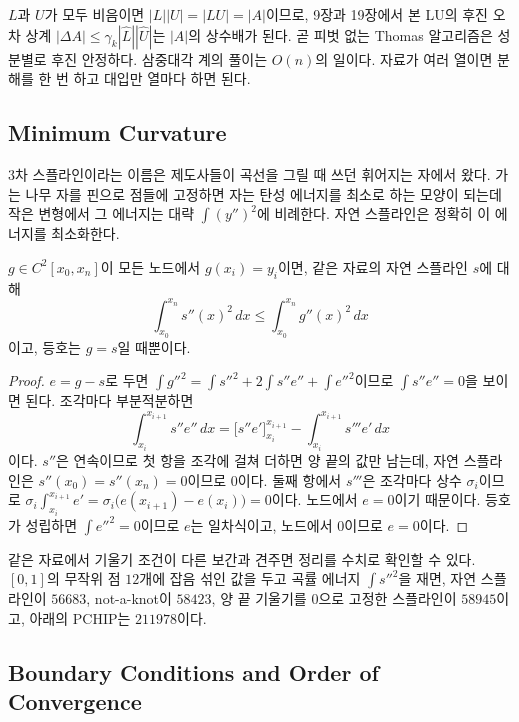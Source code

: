 $L$과 $U$가 모두 비음이면 $|L||U|=|LU|=|A|$이므로, 9장과 19장에서 본 LU의 후진 오차 상계 $|\Delta A|\le\gamma_k|\hat L||\hat U|$는 $|A|$의 상수배가 된다. 곧 피벗 없는 Thomas 알고리즘은 성분별로 후진 안정하다. 삼중대각 계의 풀이는 $O(n)$의 일이다. 자료가 여러 열이면 분해를 한 번 하고 대입만 열마다 하면 된다.

\subsection{Minimum Curvature}

3차 스플라인이라는 이름은 제도사들이 곡선을 그릴 때 쓰던 휘어지는 자에서 왔다. 가는 나무 자를 핀으로 점들에 고정하면 자는 탄성 에너지를 최소로 하는 모양이 되는데 작은 변형에서 그 에너지는 대략 $\int(y'')^2$에 비례한다. 자연 스플라인은 정확히 이 에너지를 최소화한다\cite{holladay1957}.

\begin{theorem}[Holladay]
\label{thm:holladay}
$g\in C^2[x_0,x_n]$이 모든 노드에서 $g(x_i)=y_i$이면, 같은 자료의 자연 스플라인 $s$에 대해
\[
\int_{x_0}^{x_n}s''(x)^2\,dx\le\int_{x_0}^{x_n}g''(x)^2\,dx
\]
이고, 등호는 $g=s$일 때뿐이다.
\end{theorem}

\begin{proof}
$e=g-s$로 두면 $\int g''^2=\int s''^2+2\int s''e''+\int e''^2$이므로 $\int s''e''=0$을 보이면 된다. 조각마다 부분적분하면
\[
\int_{x_i}^{x_{i+1}}s''e''\,dx=\bigl[s''e'\bigr]_{x_i}^{x_{i+1}}-\int_{x_i}^{x_{i+1}}s'''e'\,dx
\]
이다. $s''$은 연속이므로 첫 항을 조각에 걸쳐 더하면 양 끝의 값만 남는데, 자연 스플라인은 $s''(x_0)=s''(x_n)=0$이므로 $0$이다. 둘째 항에서 $s'''$은 조각마다 상수 $\sigma_i$이므로 $\sigma_i\int_{x_i}^{x_{i+1}}e'=\sigma_i\bigl(e(x_{i+1})-e(x_i)\bigr)=0$이다. 노드에서 $e=0$이기 때문이다. 등호가 성립하면 $\int e''^2=0$이므로 $e$는 일차식이고, 노드에서 $0$이므로 $e=0$이다.
\end{proof}

같은 자료에서 기울기 조건이 다른 보간과 견주면 정리를 수치로 확인할 수 있다. $[0,1]$의 무작위 점 $12$개에 잡음 섞인 값을 두고 곡률 에너지 $\int s''^2$을 재면, 자연 스플라인이 $56683$, not-a-knot이 $58423$, 양 끝 기울기를 $0$으로 고정한 스플라인이 $58945$이고, 아래의 PCHIP는 $211978$이다.

\subsection{Boundary Conditions and Order of Convergence}

